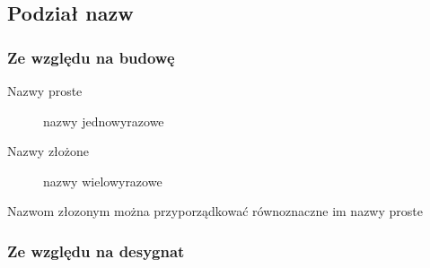 \documentclass[11pt]{article}
\begin{document}
\subsection{Podział nazw}
\label{sec:org426c5c1}

\subsubsection{Ze względu na budowę}
\label{sec:org0f72902}

\begin{description}
\item[{Nazwy proste}] nazwy jednowyrazowe
\item[{Nazwy złożone}] nazwy wielowyrazowe
\end{description}

Nazwom złozonym można przyporządkować równoznaczne im nazwy proste

\subsubsection{Ze względu na desygnat}
\label{sec:org7ca4f54}
\end{document}
